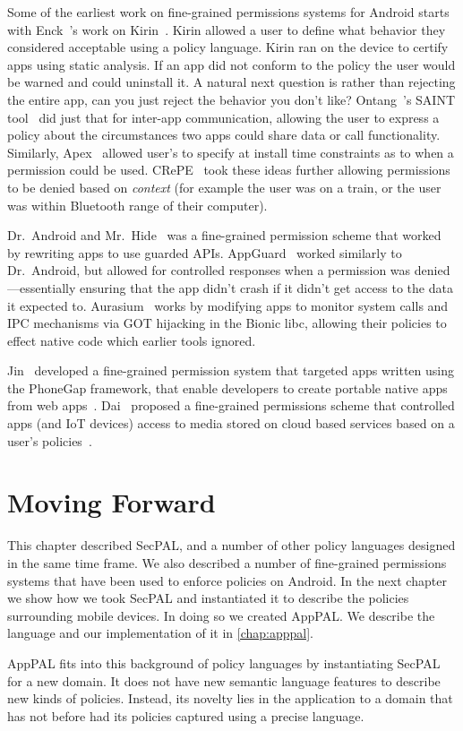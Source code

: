 \documentclass[thesis.tex]{subfiles}
\begin{document}
Some of the earliest work on fine-grained permissions systems for
Android starts with Enck~\etal's work on
Kirin~\cite{enck_lightweight_2009}.  Kirin allowed a user to define
what behavior they considered acceptable using a policy language.
Kirin ran on the device to certify apps using static analysis.  If an
app did not conform to the policy the user would be warned and could
uninstall it.  A natural next question is rather than rejecting the
entire app, can you just reject the behavior you don't like?
Ontang~\etal's SAINT tool~\cite{ongtang_semantically_2012} did just
that for inter-app communication, allowing the user to express a
policy about the circumstances two apps could share data or call
functionality.  Similarly, Apex~\cite{nauman_apex:_2010} allowed
user's to specify at install time constraints as to when a permission
could be used.  CRePE~\cite{conti_crepe:_2010} took these ideas
further allowing permissions to be denied based on \emph{context} (for
example the user was on a train, or the user was within Bluetooth
range of their computer).

Dr{.}~Android and Mr{.}~Hide~\cite{jeon_dr._2012} was a fine-grained
permission scheme that worked by rewriting apps to use guarded APIs.
AppGuard~\cite{backes_appguard_2013} worked similarly to
Dr{.}~Android, but allowed for controlled responses when a permission
was denied---essentially ensuring that the app didn't crash if it
didn't get access to the data it expected
to. Aurasium~\cite{xu_aurasium:_2012} works by modifying apps to
monitor system calls and IPC mechanisms via GOT hijacking in the
Bionic libc, allowing their policies to effect native code which
earlier tools ignored.

Jin~\etal{} developed a fine-grained permission system that targeted
apps written using the PhoneGap framework, that enable developers to
create portable native apps from web
apps~\cite{jin_fine-grained_2015}. Dai~\etal{} proposed a fine-grained
permissions scheme that controlled apps (and IoT devices) access to
media stored on cloud based services based on a user's
policies~\cite{dai_who_2017}.

\section{Moving Forward}

This chapter described SecPAL, and a number of other policy languages designed
in the same time frame. We also described a number of fine-grained permissions
systems that have been used to enforce policies on Android. In the next chapter
we show how we took SecPAL and instantiated it to describe the policies
surrounding mobile devices. In doing so we created AppPAL. We describe the
language and our implementation of it in \autoref{chap:apppal}.

AppPAL fits into this background of policy languages by instantiating SecPAL
for a new domain. It does not have new semantic language features to describe
new kinds of policies.  Instead, its novelty lies in the application to a
domain that has not before had its policies captured using a precise language.
\end{document}
